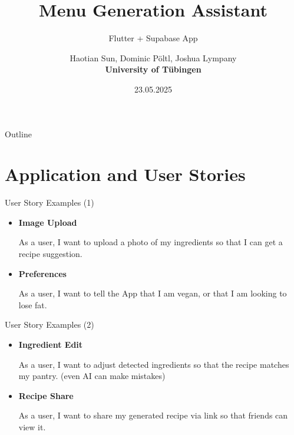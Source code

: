 \documentclass{beamer}
\title{Menu Generation Assistant}
\subtitle{Flutter + Supabase App}
\author{Haotian Sun, Dominic Pöltl, Joshua Lympany \\ \textbf{University of Tübingen}}
\date{23.05.2025}
\institute{Department of Marketing}
\begin{document}
\begin{frame}
    \titlepage
\end{frame}

\begin{frame}{Outline}
    \tableofcontents
\end{frame}




\section{Application and User Stories}
\begin{frame}{User Story Examples (1)}
  \begin{itemize}
    \item \textbf{Image Upload}  
      \begin{itemize}
        \indent As a user, I want to upload a photo of my ingredients so that I can get a recipe suggestion.
      \end{itemize}
                  \vspace{2mm}
    \item \textbf{Preferences}  
      \begin{itemize}
        \indent As a user, I want to tell the App that I am vegan, or that I am looking to lose fat.
      \end{itemize}
  \end{itemize}
\end{frame}

\begin{frame}{User Story Examples (2)}
  \begin{itemize}
    \item \textbf{Ingredient Edit}  
      \begin{itemize}
        \indent As a user, I want to adjust detected ingredients so that the recipe matches my pantry. (even AI can make mistakes)
                    \vspace{2mm}
      \end{itemize}
    \item \textbf{Recipe Share}  
      \begin{itemize}
        \indent As a user, I want to share my generated recipe via link so that friends can view it.
      \end{itemize}
  \end{itemize}
\end{frame}
\end{document}
